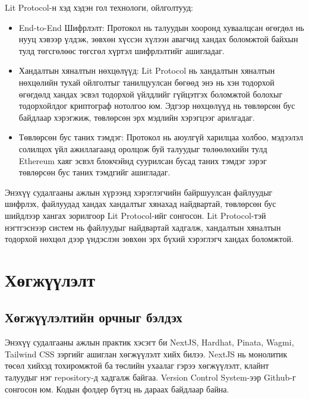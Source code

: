 Lit Protocol-н хэд хэдэн гол технологи, ойлголтууд:
\begin{itemize}
   \item  End-to-End Шифрлэлт: Протокол нь талуудын хооронд хуваалцсан өгөгдөл нь нууц хэвээр үлдэж, зөвхөн хүссэн хүлээн авагчид хандах боломжтой байхын тулд төгсгөлөөс төгсгөл хүртэл шифрлэлтийг ашигладаг.
   \item  Хандалтын хяналтын нөхцөлүүд: Lit Protocol нь хандалтын хяналтын нөхцөлийн тухай ойлголтыг танилцуулсан бөгөөд энэ нь хэн тодорхой өгөгдөлд хандах эсвэл тодорхой үйлдлийг гүйцэтгэх боломжтой болохыг тодорхойлдог криптограф нотолгоо юм. Эдгээр нөхцөлүүд нь төвлөрсөн бус байдлаар хэрэгжиж, төвлөрсөн эрх мэдлийн хэрэгцээг арилгадаг.
   \item Төвлөрсөн бус таних тэмдэг: Протокол нь аюулгүй харилцаа холбоо, мэдээлэл солилцох үйл ажиллагаанд оролцож буй талуудыг төлөөлөхийн тулд Ethereum хаяг эсвэл блокчэйнд суурилсан бусад таних тэмдэг зэрэг төвлөрсөн бус таних тэмдгийг ашигладаг.
\end{itemize}

Энэхүү судалгааны ажлын хүрээнд хэрэглэгчийн байршуулсан файлуудыг шифрлэх, файлуудад хандах хандалтыг хянахад найдвартай, төвлөрсөн бус шийдлээр хангах зорилгоор Lit Protocol-ийг сонгосон. Lit Protocol-тэй нэгтгэснээр систем нь файлуудыг найдвартай хадгалж, хандалтын хяналтын тодорхой нөхцөл дээр үндэслэн зөвхөн эрх бүхий хэрэглэгч хандах боломжтой.

\newpage
\section{Хөгжүүлэлт}

\subsection{Хөгжүүлэлтийн орчныг бэлдэх}
Энэхүү судалгааны ажлын практик хэсэгт би NextJS, Hardhat, Pinata, Wagmi, Tailwind CSS зэргийг ашиглан хөгжүүлэлт хийх билээ. NextJS нь монолитик төсөл хийхэд тохиромжтой ба төслийн ухаалаг гэрээ хөгжүүлэлт, клайнт талуудыг нэг repository-д хадгалж байгаа. Version Control System-ээр Github-г сонгосон юм. Кодын фолдер бүтэц нь дараах байдлаар байна.

